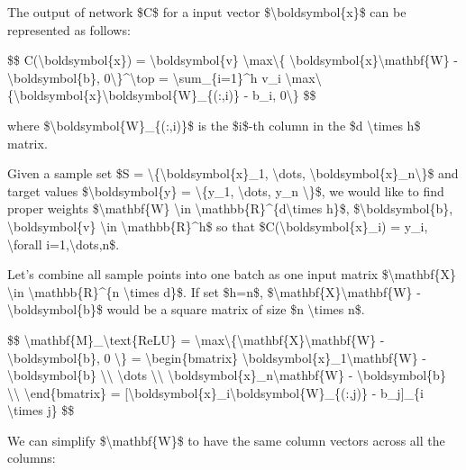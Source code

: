 The output of network \$C\$ for a input vector \$\textbackslash boldsymbol\{x\}\$ can be represented as follows:

\$\$ C(\textbackslash boldsymbol\{x\}) = \textbackslash boldsymbol\{v\} \textbackslash max\textbackslash\{ \textbackslash boldsymbol\{x\}\textbackslash mathbf\{W\} - \textbackslash boldsymbol\{b\}, 0\textbackslash\}\^{}\textbackslash top = \textbackslash sum\_\{i=1\}\^{}h v\_i \textbackslash max\textbackslash\{\textbackslash boldsymbol\{x\}\textbackslash boldsymbol\{W\}\_\{(:,i)\} - b\_i, 0\textbackslash\} \$\$

where \$\textbackslash boldsymbol\{W\}\_\{(:,i)\}\$ is the \$i\$-th column in the \$d \textbackslash times h\$ matrix.

Given a sample set \$S = \textbackslash\{\textbackslash boldsymbol\{x\}\_1, \textbackslash dots, \textbackslash boldsymbol\{x\}\_n\textbackslash\}\$ and target values \$\textbackslash boldsymbol\{y\} = \textbackslash\{y\_1, \textbackslash dots, y\_n \textbackslash\}\$, we would like to find proper weights \$\textbackslash mathbf\{W\} \textbackslash in \textbackslash mathbb\{R\}\^{}\{d\textbackslash times h\}\$, \$\textbackslash boldsymbol\{b\}, \textbackslash boldsymbol\{v\} \textbackslash in \textbackslash mathbb\{R\}\^{}h\$ so that \$C(\textbackslash boldsymbol\{x\}\_i) = y\_i, \textbackslash forall i=1,\textbackslash dots,n\$.

Let's combine all sample points into one batch as one input matrix \$\textbackslash mathbf\{X\} \textbackslash in \textbackslash mathbb\{R\}\^{}\{n \textbackslash times d\}\$. If set \$h=n\$, \$\textbackslash mathbf\{X\}\textbackslash mathbf\{W\} - \textbackslash boldsymbol\{b\}\$ would be a square matrix of size \$n \textbackslash times n\$.

\$\$ \textbackslash mathbf\{M\}\_\textbackslash text\{ReLU\} = \textbackslash max\textbackslash\{\textbackslash mathbf\{X\}\textbackslash mathbf\{W\} - \textbackslash boldsymbol\{b\}, 0 \textbackslash\} = \textbackslash begin\{bmatrix\} \textbackslash boldsymbol\{x\}\_1\textbackslash mathbf\{W\} - \textbackslash boldsymbol\{b\} \textbackslash\textbackslash{} \textbackslash dots \textbackslash\textbackslash{} \textbackslash boldsymbol\{x\}\_n\textbackslash mathbf\{W\} - \textbackslash boldsymbol\{b\} \textbackslash\textbackslash{} \textbackslash end\{bmatrix\} = {[}\textbackslash boldsymbol\{x\}\_i\textbackslash boldsymbol\{W\}\_\{(:,j)\} - b\_j{]}\_\{i \textbackslash times j\} \$\$

We can simplify \$\textbackslash mathbf\{W\}\$ to have the same column vectors across all the columns:

